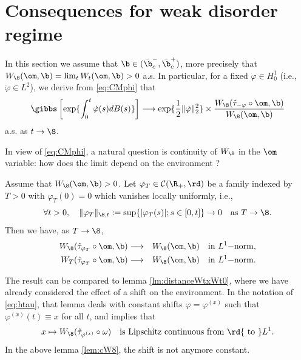 \section{Consequences for weak disorder regime}
In this section we assume that $\b \in (\bar \b_c^-, \bar \b_c^+)$, more precisely that $ W_\8( \om,\b)=\lim_{t } W_t( \om,\b)  >0$ a.s. 
In particular, for a fixed $\varphi \in H_0^1$ (i.e., $\dot \varphi \in L^2$), we derive from \eqref{eq:CMphi} that 
\begin{equation} \label{eq:phiH1}
\gibbs \left[ \exp \{  \int_0^t \dot \varphi (s) dB(s) \}
  \right]  \longrightarrow 
\exp\{ \frac{1}{2} \|\dot \varphi\|_2^2 \} \times \frac{ W_\8(\hat \tau_{-\varphi} \circ \om,\b)}{ W_\8( \om,\b)} 
\end{equation}
a.s. as $t \to \8$.

In view of \eqref{eq:CMphi}, a natural question is continuity 
of $W_\8$ in the $\om$ variable: how does the limit depend on the environment ?
\begin{lemma} \label{lem:cW8}
Assume that $W_\8(\om, \b)>0$. Let $\varphi_T \in {\cal C}(\R_+, \rd)$ be a family indexed 
by $ T>0$ with $\varphi_T(0)=0$ which vanishes locally uniformly, i.e.,
$$ \forall t>0, \quad  \|\varphi_T\|_{\8,t} := \sup\{ |\varphi_T(s)|; s \in [0,t]\}  \to 0 \quad {\rm as \ } T \to \8. $$
Then we have, as $T \to \8$, 
\begin{eqnarray} \label{eq:l721-1}
{ W_\8(\hat \tau_{\varphi_T} \circ \om,\b)} &\longrightarrow& { W_\8( \om,\b)} \quad {\rm in\ } L^1{\rm -norm,}\\
 \label{eq:l721-2}
{ W_T(\hat \tau_{\varphi_T} \circ \om,\b)} &\longrightarrow& { W_\8( \om,\b)} \quad {\rm in\ } L^1{\rm -norm.}
\end{eqnarray}
\end{lemma}
The result can be compared to lemma \ref{lm:distanceWtxWt0}, where 
we have already considered the effect of a shift on the environment. In the notation of \eqref{eq:htau}, that lemma deals with constant shifts 
$\varphi=\varphi^{(x)}$ such that
$\varphi^{(x)}(t) \equiv x$ for all $t$, and implies that 
$$
x \mapsto W_\8 ( \hat \tau_{\varphi^{(x)}} \circ \omega) \quad {\rm is\  Lipschitz\ continuous\ from\ } \rd {\rm \ to\ } L^1.
$$
In the above lemma \ref{lem:cW8}, the shift is not anymore constant.


